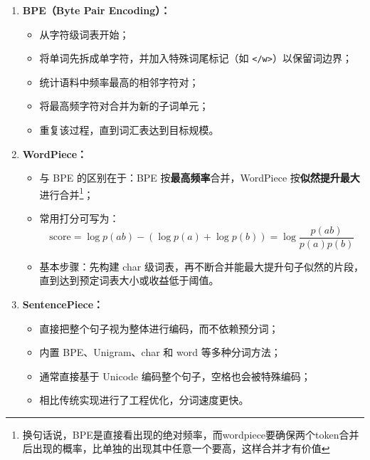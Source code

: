\documentclass[../main.tex]{subfiles}
\begin{document}
\begin{enumerate}
\begin{enumerate}
        \begin{enumerate}
            \item \textbf{BPE（Byte Pair Encoding）：}
            \begin{itemize}
                \item 从字符级词表开始；
                \item 将单词先拆成单字符，并加入特殊词尾标记（如 \texttt{</w>}）以保留词边界；
                \item 统计语料中频率最高的相邻字符对；
                \item 将最高频字符对合并为新的子词单元；
                \item 重复该过程，直到词汇表达到目标规模。
            \end{itemize}

            \item \textbf{WordPiece：}
            \begin{itemize}
                \item 与 BPE 的区别在于：BPE 按\textbf{最高频率}合并，WordPiece 按\textbf{似然提升最大}进行合并\footnote{换句话说，BPE是直接看出现的绝对频率，而wordpiece要确保两个token合并后出现的概率，比单独的出现其中任意一个要高，这样合并才有价值}；
                \item 常用打分可写为：
                $$
                \text{score}=\log p(ab)-(\log p(a)+\log p(b))
                =\log \frac{p(ab)}{p(a)p(b)}
                $$
                \item 基本步骤：先构建 char 级词表，再不断合并能最大提升句子似然的片段，直到达到预定词表大小或收益低于阈值。
            \end{itemize}

            \item \textbf{SentencePiece：}
            \begin{itemize}
                \item 直接把整个句子视为整体进行编码，而不依赖预分词；
                \item 内置 BPE、Unigram、char 和 word 等多种分词方法；
                \item 通常直接基于 Unicode 编码整个句子，空格也会被特殊编码；
                \item 相比传统实现进行了工程优化，分词速度更快。
            \end{itemize}
        \end{enumerate}
    \end{enumerate}


\end{enumerate}
\end{document}
